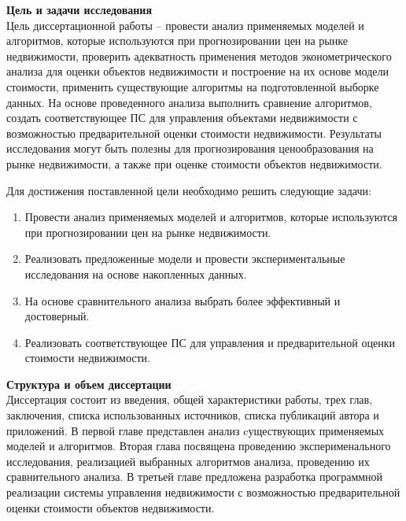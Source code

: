 \label{sec:general_description}

\textbf{Цель и задачи исследования}\\

Цель диссертационной работы – провести анализ применяемых моделей и алгоритмов, которые используются при
прогнозировании цен на рынке недвижимости, проверить адекватность применения методов эконометрического
анализа для оценки объектов недвижимости и построение на их основе модели стоимости, применить существующие алгоритмы на
подготовленной выборке данных.
На основе проведенного анализа выполнить сравнение алгоритмов, создать соответствующее ПС для управления объектами
недвижимости с возможностью предварительной оценки стоимости недвижимости.
Результаты исследования могут быть полезны для прогнозирования
ценообразования на рынке недвижимости, а также при оценке стоимости объектов недвижимости.

Для достижения поставленной цели необходимо решить следующие задачи:
\begin{enumerate}
  \item Провести анализ применяемых моделей и алгоритмов, которые используются при прогнозировании цен на рынке недвижимости.
  \item Реализовать предложенные модели и провести экспериментальные исследования на основе накопленных данных.
  \item На основе сравнительного анализа выбрать более эффективный и достоверный.
  \item Реализовать соответствующее ПС для управления и предварительной оценки стоимости недвижимости.
\end{enumerate}

\textbf{Структура и объем диссертации}\\

Диссертация состоит из введения, общей характеристики работы, трех глав, заключения, списка использованных источников,
списка публикаций автора и приложений. В первой главе представлен анализ cуществующих применяемых моделей и алгоритмов.
Вторая глава посвящена проведению эксперименального исследования, реализацией выбранных алгоритмов анализа, проведению
их сравнительного анализа. 
В третьей главе предложена разработка программной реализации системы управления недвижимости с возможностью предварительной
оценки стоимости объектов недвижимости.
